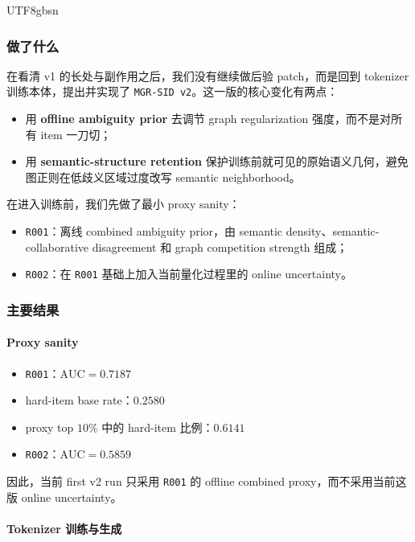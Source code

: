 \documentclass[11pt]{article}
\begin{document}
\begin{CJK*}{UTF8}{gbsn}
\subsubsection*{做了什么}

在看清 v1 的长处与副作用之后，我们没有继续做后验 patch，而是回到 tokenizer 训练本体，提出并实现了 \texttt{MGR-SID v2}。这一版的核心变化有两点：

\begin{itemize}
  \item 用 \textbf{offline ambiguity prior} 去调节 graph regularization 强度，而不是对所有 item 一刀切；
  \item 用 \textbf{semantic-structure retention} 保护训练前就可见的原始语义几何，避免图正则在低歧义区域过度改写 semantic neighborhood。
\end{itemize}

在进入训练前，我们先做了最小 proxy sanity：

\begin{itemize}
  \item \texttt{R001}：离线 combined ambiguity prior，由 semantic density、semantic-collaborative disagreement 和 graph competition strength 组成；
  \item \texttt{R002}：在 \texttt{R001} 基础上加入当前量化过程里的 online uncertainty。
\end{itemize}

\subsubsection*{主要结果}

\paragraph{Proxy sanity}

\begin{itemize}
  \item \texttt{R001}：\(\mathrm{AUC} = 0.7187\)
  \item hard-item base rate：\(0.2580\)
  \item proxy top \(10\%\) 中的 hard-item 比例：\(0.6141\)
  \item \texttt{R002}：\(\mathrm{AUC} = 0.5859\)
\end{itemize}

因此，当前 first v2 run 只采用 \texttt{R001} 的 offline combined proxy，而不采用当前这版 online uncertainty。

\paragraph{Tokenizer 训练与生成}


\end{CJK*}
\end{document}
